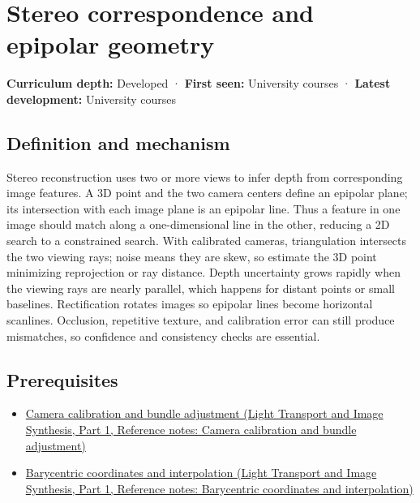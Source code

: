 \hypertarget{appendix-c4e98b6e4001}{}\label{referencestart:appendix-c4e98b6e4001}
\section{Stereo correspondence and epipolar geometry}\label{appendix-c4e98b6e4001-stereo-correspondence-and-epipolar-geometry}

\hypertarget{appendix-c4e98b6e4001-stereo-correspondence-and-epipolar-geometry}{}

\textbf{Curriculum depth:} Developed · \textbf{First seen:} University courses · \textbf{Latest development:} University courses

\begin{allmightroledefinition}

\subsection{Definition and mechanism}\label{appendix-c4e98b6e4001-definition-and-mechanism}

\hypertarget{appendix-c4e98b6e4001-definition-and-mechanism}{}

Stereo reconstruction uses two or more views to infer depth from corresponding image features. A 3D point and the two camera centers define an epipolar plane; its intersection with each image plane is an epipolar line. Thus a feature in one image should match along a one-dimensional line in the other, reducing a 2D search to a constrained search. With calibrated cameras, triangulation intersects the two viewing rays; noise means they are skew, so estimate the 3D point minimizing reprojection or ray distance. Depth uncertainty grows rapidly when the viewing rays are nearly parallel, which happens for distant points or small baselines. Rectification rotates images so epipolar lines become horizontal scanlines. Occlusion, repetitive texture, and calibration error can still produce mismatches, so confidence and consistency checks are essential.

\end{allmightroledefinition}

\subsection{Prerequisites}\label{appendix-c4e98b6e4001-prerequisites}

\hypertarget{appendix-c4e98b6e4001-prerequisites}{}

\begin{itemize}
\tightlist
\item
  \href{../04-Light-Transport-and-Image-Synthesis-P01/main.pdf\#nameddest=appendix-3ee9861904d5}{Camera calibration and bundle adjustment (Light Transport and Image Synthesis, Part 1, Reference notes: Camera calibration and bundle adjustment)}
\item
  \href{../04-Light-Transport-and-Image-Synthesis-P01/main.pdf\#nameddest=appendix-02b9d9a81dca}{Barycentric coordinates and interpolation (Light Transport and Image Synthesis, Part 1, Reference notes: Barycentric coordinates and interpolation)}
\end{itemize}

